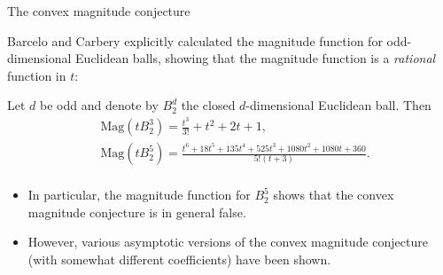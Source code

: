\documentclass[12pt,mathserif]{beamer}
\begin{document}
\begin{frame}[allowframebreaks]{The convex magnitude conjecture}
\framebreak

Barcelo and Carbery explicitly calculated the magnitude function for odd-dimensional Euclidean balls, showing that the magnitude function is a \emph{rational} function in $t$:

\begin{theorem}
Let $d$ be odd and denote by $B_2^d$ the closed $d$-dimensional Euclidean ball. Then
\begin{align*}\label{eqn:explicitmagfuns}
&\text{Mag}\left(tB_2^3\right) = \frac{t^3}{3!}+t^2+2t+1, \\
&\text{Mag}\left(tB_2^5\right) = \frac{t^6+18t^5+135t^4+525t^3+1080t^2+1080t+360}{5!(t+3)}. \\
\end{align*}
\end{theorem}

\begin{itemize}
\item In particular, the magnitude function for $B_2^5$ shows that the convex magnitude conjecture is in general false.
\item However, various asymptotic versions of the convex magnitude conjecture (with somewhat different coefficients) have been shown.
\end{itemize}

\end{frame}
\end{document}
